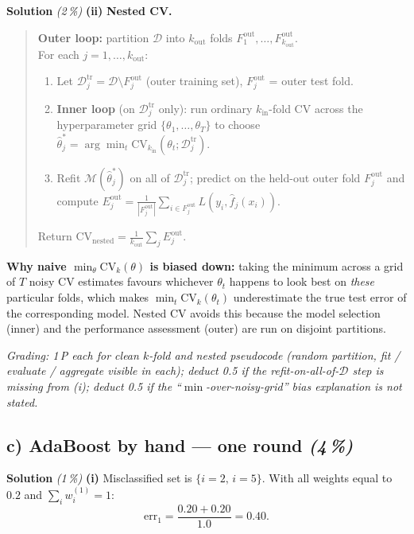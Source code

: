 \documentclass[11pt,a4paper]{article}
\newcommand{\subpoints}[1]{\textit{(#1\,\%)}}
\newcommand{\sol}{\noindent\textbf{Solution}}
\begin{document}
\medskip
\sol{} \subpoints{2} \textbf{(ii)} \textbf{Nested CV.}
\begin{quote}\small
\textbf{Outer loop:} partition $\mathcal D$ into $k_{\text{out}}$ folds $F_1^{\text{out}},\dots,F_{k_{\text{out}}}^{\text{out}}$. \\
For each $j = 1, \dots, k_{\text{out}}$:
\begin{enumerate}
  \item Let $\mathcal D_j^{\text{tr}} = \mathcal D\setminus F_j^{\text{out}}$ (outer training set),
        $F_j^{\text{out}}$ = outer test fold.
  \item \textbf{Inner loop} (on $\mathcal D_j^{\text{tr}}$ only): run ordinary $k_{\text{in}}$-fold
        CV across the hyperparameter grid $\{\theta_1,\dots,\theta_T\}$ to choose
        $\hat\theta_j^* = \arg\min_t \mathrm{CV}_{k_{\text{in}}}(\theta_t;\mathcal D_j^{\text{tr}})$.
  \item Refit $\mathcal M(\hat\theta_j^*)$ on all of $\mathcal D_j^{\text{tr}}$; predict on the
        held-out outer fold $F_j^{\text{out}}$ and compute
        $E_j^{\text{out}} = \tfrac{1}{|F_j^{\text{out}}|}\sum_{i\in F_j^{\text{out}}} L(y_i, \hat f_j(x_i))$.
\end{enumerate}
Return $\mathrm{CV}_{\text{nested}} = \tfrac{1}{k_{\text{out}}}\sum_j E_j^{\text{out}}$.
\end{quote}
\textbf{Why naive $\min_\theta \mathrm{CV}_k(\theta)$ is biased down:} taking the minimum across a
grid of $T$ noisy CV estimates favours whichever $\theta_t$ happens to look best on \emph{these}
particular folds, which makes $\min_t \mathrm{CV}_k(\theta_t)$ underestimate the true test error
of the corresponding model. Nested CV avoids this because the model selection (inner) and the
performance assessment (outer) are run on disjoint partitions.

\noindent\emph{Grading: 1\,P each for clean $k$-fold and nested pseudocode (random partition, fit /
evaluate / aggregate visible in each); deduct 0.5 if the refit-on-all-of-$\mathcal D$ step is
missing from (i); deduct 0.5 if the ``$\min$-over-noisy-grid'' bias explanation is not stated.}

\subsection*{c) AdaBoost by hand --- one round \subpoints{4}}

\sol{} \subpoints{1} \textbf{(i)} Misclassified set is $\{i=2,\,i=5\}$. With all weights equal to
$0.2$ and $\sum_i w_i^{(1)} = 1$:
$$\mathrm{err}_1 = \frac{0.20 + 0.20}{1.0} = \boxed{0.40}.$$
\end{document}
